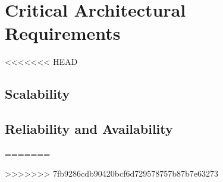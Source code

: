 \documentclass[a4paper,12pt,titlepage]{article}
\begin{document}


\tableofcontents
\newpage



\section{Critical Architectural Requirements}




<<<<<<< HEAD
\subsection{Scalability}


\subsection{Reliability and Availability}

=======

>>>>>>> 7fb9286cdb90420bcf6d729578757b87b7e63273






\end{document}
